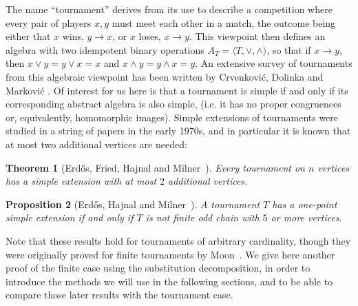 \documentclass[11pt]{article}
\newtheorem{theorem}{Theorem}[section]
\newtheorem{proposition}[theorem]{Proposition}
\begin{document}
The name ``tournament'' derives from its use to describe a competition where every pair of players $x,y$ must meet each other in a match, the outcome being either that $x$ wins, $y\rightarrow x$, or $x$ loses, $x\rightarrow y$. This viewpoint then defines an algebra with two idempotent binary operations $A_T=\langle T,\vee,\wedge\rangle$, so that if $x\rightarrow y$, then $x\vee y = y\vee x = x$ and $x\wedge y = y\wedge x = y$.
An extensive survey of tournaments from this algebraic viewpoint has been written by Crvenkovi{\'c}, Dolinka and Markovi{\'c} \cite{crvenkovic:a-survey-of-alg:}.
Of interest for us here is that a tournament is simple if and only if its corresponding abstract algebra is also simple,
(i.e. it has no proper congruences or, equivalently, homomorphic images).
Simple extensions of tournaments were studied in a string of papers in the early 1970s, and in particular it is known that
at most two additional vertices are needed:

\begin{theorem}[Erd{\H{o}}s, Fried, Hajnal and Milner~{\cite{erdos:some-remarks-on:}}]\label{tournament}
Every tournament on $n$ vertices has a simple extension with at most $2$ additional vertices.
\end{theorem}

\begin{proposition}[Erd{\H{o}}s, Hajnal and Milner~{\cite{erdos:simple-one-poin:}}]\label{tournament-one-point}
A tournament $T$ has a one-point simple extension if and only if $T$ is not finite odd chain with $5$ or more vertices.
\end{proposition}

Note that these results hold for tournaments of arbitrary cardinality, though they were originally proved for finite tournaments by Moon~\cite{moon:embedding-tourn:}. We give here another proof of the finite case using the substitution decomposition,
in order to introduce the methods we will use in the following sections, and to be able to compare those later results with the tournament case.
\end{document}
